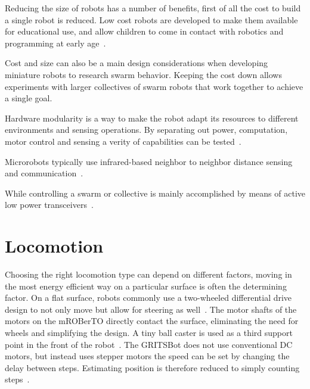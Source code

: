 

Reducing the size of robots has a number of benefits, first of all the cost to build a single robot is reduced.
Low cost robots are developed to make them available for educational use, and allow children to come in contact with robotics and programming at early age~\cite{rubenstein_icra_2015}.


Cost and size can also be a main design considerations when developing miniature robots to research swarm behavior.
Keeping the cost down allows experiments with larger collectives of swarm robots that work together to achieve a single goal.


Hardware modularity is a way to make the robot adapt its resources to different environments and sensing operations.
By separating out power, computation, motor control and sensing a verity of capabilities can be tested~\cite{sabelhaus_icra_2013, pickem_icra_2015, kim_iros_2016}.

Microrobots typically use infrared-based neighbor to neighbor distance sensing and communication~\cite{rubenstein_icra_2012, pickem_icra_2015, kim_iros_2016}.

While controlling a swarm or collective is mainly accomplished by means of active low power transceivers~\cite{sabelhaus_icra_2013, pickem_icra_2015, kim_iros_2016}. 

\section{Locomotion}
\label{sec:locomotion}

Choosing the right locomotion type can depend on different factors, moving in the most energy efficient way on a particular surface is often the determining factor.
On a flat surface, robots commonly use a two-wheeled differential drive design to not only move but allow for steering as well~\cite{sabelhaus_icra_2013, pickem_icra_2015}.
The motor shafts of the motors on the mROBerTO directly contact the surface, eliminating the need for wheels and simplifying the design.
A tiny ball caster is used as a third support point in the front of the robot~\cite{kim_iros_2016}.
The GRITSBot does not use conventional DC motors, but instead uses stepper motors the speed can be set by changing the delay between steps. 
Estimating position is therefore reduced to simply counting steps~\cite{pickem_icra_2015}.

